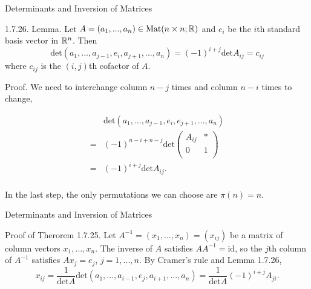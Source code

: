\documentclass[hyperref={pdfpagelabels=true}]{beamer}
\newcommand{\Mat}{\text{Mat}}
\newcommand{\<}{\langle}
\renewcommand{\>}{\rangle}
\begin{document}
        \begin{frame}{Determinants and Inversion of Matrices}
            \begin{block}{1.7.26. Lemma.}
                Let $A = (a_{1},...,a_{n}) \in \Mat(n \times n;\R)$ and $e_{i}$ be the $i$th standard basis vector in $\mathbb{R}^{n}$. Then
                \[\text{det}(a_{1},...,a_{j-1},e_{i},a_{j+1},...,a_{n}) = (-1)^{i+j}\text{det}A_{ij} = c_{ij}\]
                where $c_{ij}$ is the $(i,j)$th cofactor of $A$.
            \end{block}
            \begin{block}{Proof.}
                We need to interchange column $n-j$ times and column $n-i$ times to change,
                \begin{spacing}{0.7}
                \[
                    \begin{aligned}
                        &\text{det}(a_{1},...,a_{j-1},e_{i},e_{j+1},...,a_{n})\\
                        =&(-1)^{n-i+n-j}\text{det}
                        \begin{pmatrix}
                            A_{ij} & *\\
                            0 & 1\\
                        \end{pmatrix}\\
                        =&(-1)^{i+j}\text{det}A_{ij}.\\
                    \end{aligned}
                \]
                \end{spacing}
                In the last step, the only permutations we can choose are $\pi(n) = n$.
            \end{block}
        \end{frame}
        \begin{frame}{Determinants and Inversion of Matrices}
            \begin{block}{Proof of Therorem 1.7.25.}
                Let $A^{-1} = (x_{1},...,x_{n}) = (x_{ij})$ be a matrix of column vectors $x_{1},...,x_{n}$. The inverse of $A$ satisfies $AA^{-1} = \text{id}$, so the $j$th column of $A^{-1}$ satisfies $Ax_{j} = e_{j}$, $j = 1,...,n$.
                By Cramer's rule and Lemma 1.7.26,
                \[x_{ij} = \frac{1}{\text{det}A}\text{det}(a_{1},...,a_{i-1},e_{j},a_{i+1},...,a_{n}) = \frac{1}{\text{det}A}(-1)^{i+j}A_{ji}.\]
            \end{block}
        \end{frame}
\end{document}
